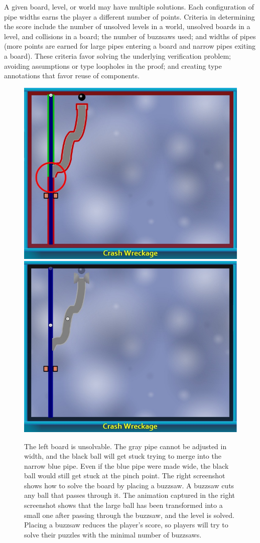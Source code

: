 \documentclass{sig-alternate}
\let\Description =\description
\def\Nospacing{\itemsep=0pt\topsep=0pt\partopsep=0pt\parskip=0pt\parsep=0pt}
\renewenvironment{description}{\Description\Nospacing}{\endlist}
\begin{document}
\begin{description}
\item[Scoring]
  A given board, level, or world may have multiple solutions.  Each
  configuration of pipe widths earns the player a different number of
  points.  Criteria in determining the score include
  the number of unsolved levels in a world, unsolved boards in a level, and
  collisions in a board; the number of buzzsaws used; and widths of pipes
  (more points are earned for large pipes entering a board and narrow pipes
  exiting a board).  These criteria favor solving the underlying
  verification problem; avoiding assumptions or type loopholes in the
  proof; and creating type annotations that favor reuse of components.

\end{description}



\begin{figure}
\begin{center}
\includegraphics[width=.49\textwidth]{images/unsolvable-pre-buzzsaw}%
\hfill%
\includegraphics[width=.49\textwidth]{images/unsolvable-post-buzzsaw}
\end{center}

\caption{
  The left board is unsolvable.  The gray pipe cannot be adjusted in width,
  and the black ball will get stuck trying to merge into the narrow blue
  pipe.  Even if the blue pipe were made wide, the black ball would still
  get stuck at the pinch point.
  \newline
  The right screenshot shows how to solve the board by placing a buzzsaw.
  A buzzsaw cuts any ball that passes through it.  The animation captured
  in the right screenshot shows that the large ball has been transformed
  into a small one after passing through the buzzsaw, and the level is
  solved.  Placing a buzzsaw reduces the player's score, so players will
  try to solve their puzzles with the minimal number of buzzsaws.
}
\label{fig:game-buzzsaw}
\end{figure}
\end{document}
